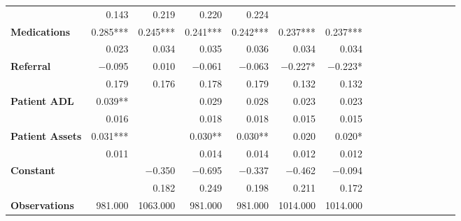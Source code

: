 \begin{tabular}{@{\extracolsep{5pt}}lrrrrrrrrrrrrrrr}
{\bf } & 0.143\phantom{\phantom{)}***} & 0.219\phantom{\phantom{)}***} & 0.220\phantom{\phantom{)}***} & 0.224\phantom{\phantom{)}***} & \phantom{***} & \phantom{***} \\
{\bf Medications} & 0.285\phantom{)}*** & 0.245\phantom{)}*** & 0.241\phantom{)}*** & 0.242\phantom{)}*** & 0.237\phantom{)}*** & 0.237\phantom{)}*** \\
{\bf } & 0.023\phantom{\phantom{)}***} & 0.034\phantom{\phantom{)}***} & 0.035\phantom{\phantom{)}***} & 0.036\phantom{\phantom{)}***} & 0.034\phantom{\phantom{)}***} & 0.034\phantom{\phantom{)}***} \\
{\bf Referral} & $-$0.095\phantom{\phantom{)}***} & 0.010\phantom{\phantom{)}***} & $-$0.061\phantom{\phantom{)}***} & $-$0.063\phantom{\phantom{)}***} & $-$0.227\phantom{)}*\phantom{**} & $-$0.223\phantom{)}*\phantom{**} \\
{\bf } & 0.179\phantom{\phantom{)}***} & 0.176\phantom{\phantom{)}***} & 0.178\phantom{\phantom{)}***} & 0.179\phantom{\phantom{)}***} & 0.132\phantom{\phantom{)}***} & 0.132\phantom{\phantom{)}***} \\
{\bf Patient ADL} & 0.039\phantom{)}**\phantom{*} & \phantom{***} & 0.029\phantom{\phantom{)}***} & 0.028\phantom{\phantom{)}***} & 0.023\phantom{\phantom{)}***} & 0.023\phantom{\phantom{)}***} \\
{\bf } & 0.016\phantom{\phantom{)}***} & \phantom{***} & 0.018\phantom{\phantom{)}***} & 0.018\phantom{\phantom{)}***} & 0.015\phantom{\phantom{)}***} & 0.015\phantom{\phantom{)}***} \\
{\bf Patient Assets} & 0.031\phantom{)}*** & \phantom{***} & 0.030\phantom{)}**\phantom{*} & 0.030\phantom{)}**\phantom{*} & 0.020\phantom{\phantom{)}***} & 0.020\phantom{)}*\phantom{**} \\
{\bf } & 0.011\phantom{\phantom{)}***} & \phantom{***} & 0.014\phantom{\phantom{)}***} & 0.014\phantom{\phantom{)}***} & 0.012\phantom{\phantom{)}***} & 0.012\phantom{\phantom{)}***} \\
{\bf Constant} & \phantom{***} & $-$0.350\phantom{\phantom{)}***} & $-$0.695\phantom{\phantom{)}***} & $-$0.337\phantom{\phantom{)}***} & $-$0.462\phantom{\phantom{)}***} & $-$0.094\phantom{\phantom{)}***} \\
{\bf } & \phantom{***} & 0.182\phantom{\phantom{)}***} & 0.249\phantom{\phantom{)}***} & 0.198\phantom{\phantom{)}***} & 0.211\phantom{\phantom{)}***} & 0.172\phantom{\phantom{)}***} \\
{\bf Observations} & 981.000\phantom{\phantom{)}***} & 1063.000\phantom{\phantom{)}***} & 981.000\phantom{\phantom{)}***} & 981.000\phantom{\phantom{)}***} & 1014.000\phantom{\phantom{)}***} & 1014.000\phantom{\phantom{)}***} \\

\end{tabular}

